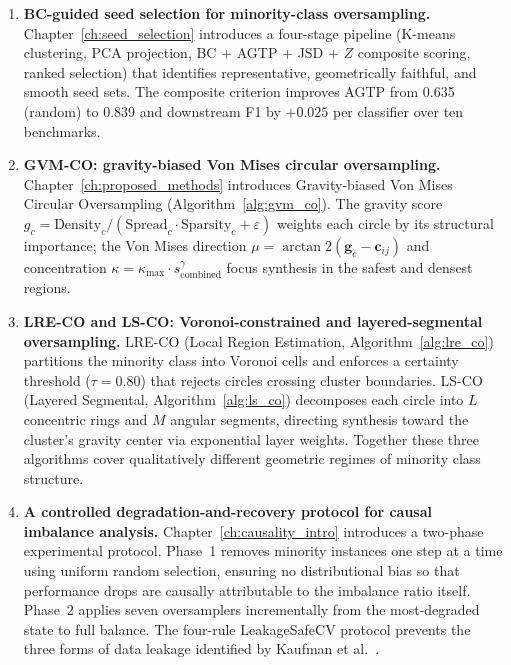 \begin{enumerate}[label=\textbf{C\arabic*.}, leftmargin=*, itemsep=6pt]

  \item \textbf{BC-guided seed selection for minority-class oversampling.}
  Chapter~\ref{ch:seed_selection} introduces a four-stage pipeline (K-means clustering, PCA projection, BC + AGTP + JSD + $Z$ composite scoring, ranked selection) that identifies representative, geometrically faithful, and smooth seed sets.
  The composite criterion improves AGTP from 0.635 (random) to 0.839 and downstream F1 by $+0.025$ per classifier over ten benchmarks.

  \item \textbf{GVM-CO: gravity-biased Von Mises circular oversampling.}
  Chapter~\ref{ch:proposed_methods} introduces Gravity-biased Von Mises Circular Oversampling (Algorithm~\ref{alg:gvm_co}).
  The gravity score $g_c = \text{Density}_c / (\text{Spread}_c \cdot \text{Sparsity}_c + \varepsilon)$ weights each circle by its structural importance; the Von Mises direction $\mu = \arctan2(\mathbf{g}_c - \mathbf{c}_{ij})$ and concentration $\kappa = \kappa_{\max} \cdot s_{\text{combined}}^\gamma$ focus synthesis in the safest and densest regions.

  \item \textbf{LRE-CO and LS-CO: Voronoi-constrained and layered-segmental oversampling.}
  LRE-CO (Local Region Estimation, Algorithm~\ref{alg:lre_co}) partitions the minority class into Voronoi cells and enforces a certainty threshold ($\tau = 0.80$) that rejects circles crossing cluster boundaries.
  LS-CO (Layered Segmental, Algorithm~\ref{alg:ls_co}) decomposes each circle into $L$ concentric rings and $M$ angular segments, directing synthesis toward the cluster's gravity center via exponential layer weights.
  Together these three algorithms cover qualitatively different geometric regimes of minority class structure.

  \item \textbf{A controlled degradation-and-recovery protocol for causal imbalance analysis.}
  Chapter~\ref{ch:causality_intro} introduces a two-phase experimental protocol.
  Phase~1 removes minority instances one step at a time using uniform random selection, ensuring no distributional bias so that performance drops are causally attributable to the imbalance ratio itself.
  Phase~2 applies seven oversamplers incrementally from the most-degraded state to full balance.
  The four-rule LeakageSafeCV protocol prevents the three forms of data leakage identified by Kaufman et al.~\cite{kaufman2012leakage}.


\end{enumerate}

